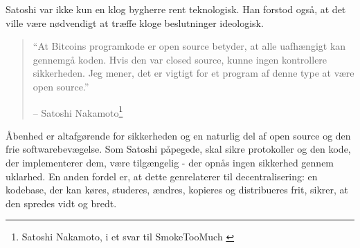 \documentclass[paper=6in:9in,pagesize=pdftex,headinclude=on,footinclude=on,12pt]{scrbook}
\begin{document}
Satoshi var ikke kun en klog bygherre rent teknologisk. Han forstod også, at det ville være nødvendigt at træffe kloge beslutninger ideologisk.\begin{quotation}\begin{samepage} \enquote{At Bitcoins programkode er open source betyder, at alle uafhængigt kan gennemgå koden. Hvis den var closed source, kunne ingen kontrollere sikkerheden. Jeg mener, det er vigtigt for et program af denne type at være open source.} \begin{flushright} -- Satoshi Nakamoto\footnote{Satoshi Nakamoto, i et svar til SmokeTooMuch \cite{satoshi-open-source}}
\end{flushright}\end{samepage}\end{quotation}

Åbenhed er altafgørende for sikkerheden og en naturlig del af open source og den frie softwarebevægelse. Som Satoshi påpegede, skal sikre protokoller og den kode, der implementerer dem, være tilgængelig - der opnås ingen sikkerhed gennem uklarhed. En anden fordel er, at dette genrelaterer til decentralisering: en kodebase, der kan køres, studeres, ændres, kopieres og distribueres frit, sikrer, at den spredes vidt og bredt.
\end{document}
